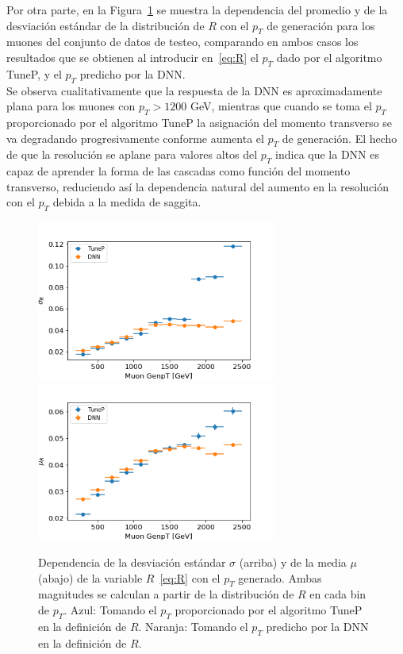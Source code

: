 Por otra parte, en la Figura~\ref{fig:R_vs_genpt} se muestra la dependencia del promedio y de la desviaci\'on est\'andar de la distribuci\'on de $R$ con el $p_{T}$ de generaci\'on para los muones del conjunto de datos de testeo, comparando en ambos casos los resultados que se obtienen al introducir en~\eqref{eq:R} el $p_{T}$ dado por el algoritmo TuneP, y el $p_{T}$ predicho por la DNN. \\
Se observa cualitativamente que la respuesta de la DNN es aproximadamente plana para los muones con $p_{T} > 1200$ GeV, mientras que cuando se toma el $p_{T}$ proporcionado por el algoritmo TuneP la asignaci\'on del momento transverso se va degradando progresivamente conforme aumenta el $p_{T}$ de generaci\'on. El hecho de que la resoluci\'on se aplane para valores altos del $p_{T}$ indica que la DNN es capaz de aprender la forma de las cascadas como funci\'on del momento transverso, reduciendo as\'i la dependencia natural del aumento en la resoluci\'on con el $p_{T}$ debida a la medida de saggita. \\

\begin{figure}[h]
\centering
\includegraphics[width=0.7\textwidth]{figures/SigmaR_vs_genpT.png}
\includegraphics[width=0.7\textwidth]{figures/MeanR_vs_genpT.png}
\caption{Dependencia de la desviaci\'on est\'andar $\sigma$ (arriba) y de la media $\mu$ (abajo) de la variable $R$~\eqref{eq:R} con el $p_{T}$ generado. Ambas magnitudes se calculan a partir de la distribuci\'on de $R$ en cada bin de $p_{T}$. Azul: Tomando el $p_{T}$ proporcionado por el algoritmo TuneP en la definici\'on de $R$. Naranja: Tomando el $p_{T}$ predicho por la DNN en la definici\'on de $R$.}
\label{fig:R_vs_genpt}        
\end{figure}

